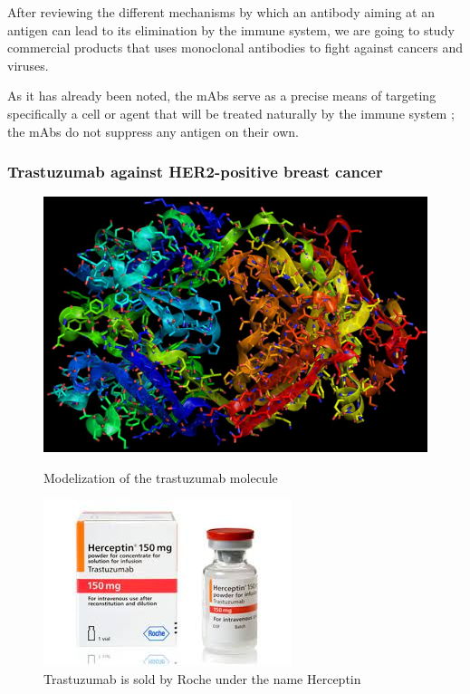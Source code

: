 \newpage
After reviewing the different mechanisms by which an antibody aiming at
an antigen can lead to its elimination by the immune system, we are going
to study commercial products that uses monoclonal antibodies to fight
against cancers and viruses.

As it has already been noted, the mAbs serve as a precise means of targeting
specifically a cell or agent that will be treated naturally by the immune system ; 
the mAbs do not suppress any antigen on their own.

\subsubsection{Trastuzumab against HER2-positive breast cancer}

\begin{figure}[H]
    \begin{minipage}{0.495\textwidth}
            \centering
            \includegraphics[width=\textwidth]{../Images/herceptin.jpg}
            \caption{Modelization of the trastuzumab molecule}
            \label{fig:trastuzumab}
    \end{minipage}\hfill
    \begin{minipage}{0.495\textwidth}
            \centering
            \includegraphics[width=\textwidth]{../Images/trastuzumab.jpg}
            \caption{Trastuzumab is sold by Roche under the name Herceptin
            \cite{roche_herceptin_nodate}}
            \label{fig:herceptin}
    \end{minipage}
\end{figure}

